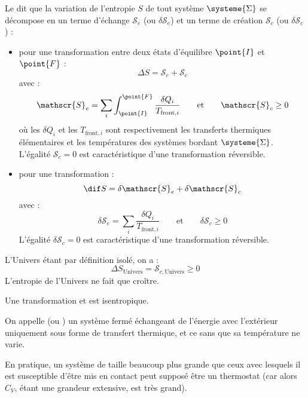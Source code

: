 \begin{definition}
Le  dit que la variation de l'entropie $S$ de tout système $\systeme{\Sigma}$  se décompose en un terme d'échange $\mathscr{S}_e$ (ou $\delta \mathscr{S}_e$) et un terme de création $\mathscr{S}_c$ (ou $\delta \mathscr{S}_c$) :
\begin{itemize}
\item pour une transformation entre deux états d'équilibre $\point{I}$ et $\point{F}$ :
\[\Delta S = \mathscr{S}_e + \mathscr{S}_c\]
avec :
\[\mathscr{S}_e = \sum_i \int_{\point{I}}^{\point{F}} \frac{\delta Q_i}{T_{\mathrm{front}, i}} \qquad \text{et} \qquad \mathscr{S}_c \geq 0\]
où les $\delta Q_i$ et les $T_{\mathrm{front}, i}$ sont respectivement les transferts thermiques élémentaires et les températures des systèmes bordant $\systeme{\Sigma}$. L'égalité $\mathscr{S}_c = 0$ est caractéristique d'une transformation réversible.

\item pour une transformation  :
\[\dif S = \delta \mathscr{S}_e + \delta \mathscr{S}_c\]
avec :
\[\delta \mathscr{S}_e = \sum_i \frac{\delta Q_i}{T_{\mathrm{front}, i}} \qquad \text{et} \qquad \delta \mathscr{S}_c \geq 0\]
L'égalité $\delta \mathscr{S}_c = 0$ est caractéristique d'une transformation réversible.
\end{itemize}
\end{definition}

\begin{remarque}
L'Univers étant par définition isolé, on a :
\[\Delta S_{\mathrm{Univers}} = \mathscr{S}_{c, \mathrm{Univers}} \geq 0\]
L'entropie de l'Univers ne fait que croître.
\end{remarque}

\begin{propriete}
Une transformation  et  est isentropique.
\end{propriete}

\begin{definition}
On appelle  (ou ) un système fermé échangeant de l'énergie avec l'extérieur uniquement sous forme de transfert thermique, et ce sans que sa température ne varie.
\end{definition}

\begin{remarque}
En pratique, un système de taille beaucoup plus grande que ceux avec lesquels il est susceptible d'être mis en contact peut supposé être un thermostat (car alors $C_V$, étant une grandeur extensive, est très grand).
\end{remarque}

